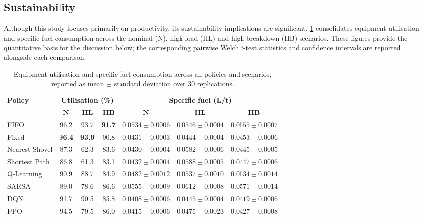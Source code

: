 \documentclass[11pt,a4paper]{article}
\begin{document}
\subsection{Sustainability}
\label{sec:sustainability}

Although this study focuses primarily on productivity, its sustainability implications are significant.
\cref{tab:efficiency} consolidates equipment utilisation and specific fuel consumption across the nominal (N), high-load (HL) and high-breakdown (HB) scenarios. These figures provide the quantitative basis for the discussion below; the corresponding pairwise Welch $t$-test statistics and confidence intervals are reported alongside each comparison.

\begin{table}[H]
\centering
\caption{Equipment utilisation and specific fuel consumption across all policies and scenarios, reported as mean $\pm$ standard deviation over 30 replications.}
\label{tab:efficiency}
\footnotesize\setlength{\tabcolsep}{3pt}
\begin{tabular}{lcccccc}
\toprule
\multirow{2}{*}{\textbf{Policy}}
  & \multicolumn{3}{c}{\textbf{Utilisation (\%)}}
  & \multicolumn{3}{c}{\textbf{Specific fuel (L/t)}} \\
\cmidrule(lr){2-4}\cmidrule(lr){5-7}
  & \textbf{N} & \textbf{HL} & \textbf{HB}
  & \textbf{N}     & \textbf{HL}    & \textbf{HB} \\
\midrule
FIFO            & 96.2 & 93.7 & \textbf{91.7}  & $0.0534\pm0.0006$ & $0.0546\pm0.0004$ & $0.0555\pm0.0007$ \\
Fixed           & \textbf{96.4} & \textbf{93.9} & 90.8  & $0.0431\pm0.0003$ & $\mathbf{0.0444\pm0.0004}$ & $0.0453\pm0.0006$ \\
Nearest Shovel  & 87.3 & 62.3 & 83.6  & $0.0430\pm0.0004$ & $0.0582\pm0.0006$ & $0.0445\pm0.0005$ \\
Shortest Path   & 86.8 & 61.3 & 83.1  & $0.0432\pm0.0004$ & $0.0588\pm0.0005$ & $0.0447\pm0.0006$ \\
Q-Learning      & 90.9 & 88.7 & 84.9  & $0.0482\pm0.0012$ & $0.0537\pm0.0010$ & $0.0534\pm0.0014$ \\
SARSA           & 89.0 & 78.6 & 86.6  & $0.0555\pm0.0009$ & $0.0612\pm0.0008$ & $0.0571\pm0.0014$ \\
DQN             & 91.7 & 90.5 & 85.8  & $\mathbf{0.0408\pm0.0006}$ & $0.0445\pm0.0004$ & $\mathbf{0.0419\pm0.0006}$ \\
PPO             & 94.5 & 79.5 & 86.0  & $0.0415\pm0.0006$ & $0.0475\pm0.0023$ & $0.0427\pm0.0008$ \\
\bottomrule
\end{tabular}
\end{table}
\end{document}
